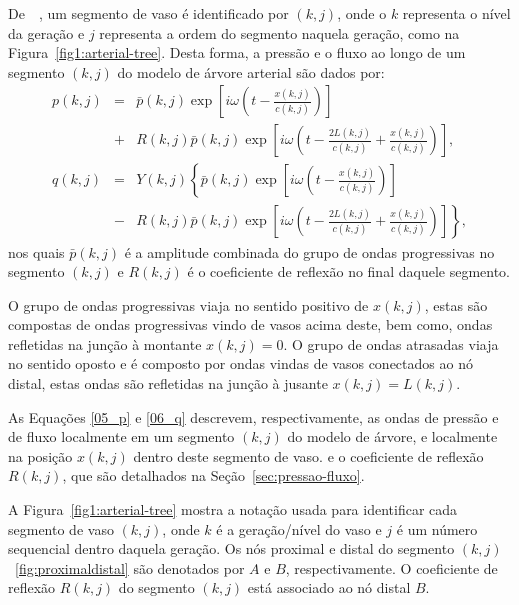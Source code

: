 De~\citeyear{Duan}~, um segmento de vaso é identificado por $(k,j)$, onde o $k$ representa o nível da geração e $j$ representa a ordem do segmento naquela geração, como na Figura~\ref{fig1:arterial-tree}. Desta forma, a pressão e o fluxo ao longo de um segmento  $(k,j)$ do modelo de árvore arterial são dados por:
\begin{eqnarray}
	p(k,j) &=& \bar{p}(k,j) \exp\left[i\omega\left(t - \frac{x(k,j)}{c(k,j)}\right)\right] \nonumber \\
	&+& R(k,j)  \bar{p}(k,j) \exp\left[i\omega\left(t - \frac{2L(k,j)}{c(k,j)} + \frac{x(k,j)}{c(k,j)}\right)\right],
	\label{05_p}\\
	q (k,j) &=& Y(k,j)\left\{\bar{p}(k,j) \exp\left[i\omega\left(t - \frac{x(k,j)}{c(k,j)}\right)\right]\right. \nonumber \\
	&-& \left. R(k,j)  \bar{p}(k,j) \exp\left[i\omega\left(t - \frac{2L(k,j)}{c(k,j)} + \frac{x(k,j)}{c(k,j)}\right)\right]\right\},
	\label{06_q}
\end{eqnarray}
nos quais $\bar{p}(k,j)$ é a amplitude combinada do grupo de ondas progressivas no segmento $(k,j)$ e $R(k,j)$ é o coeficiente de reflexão no final daquele segmento. 

O grupo de ondas progressivas viaja no sentido positivo de $x(k,j)$, estas são compostas de ondas progressivas vindo de vasos acima deste, bem como, ondas refletidas na junção à montante $x(k,j) = 0$. O grupo de ondas atrasadas viaja no sentido oposto e é composto por ondas vindas de vasos conectados ao nó distal, estas ondas são refletidas na junção à jusante $x(k,j) = L(k,j)$. 

As Equações \eqref{05_p} e \eqref{06_q} descrevem, respectivamente, as ondas de pressão e de fluxo localmente em um segmento $(k,j)$ do modelo de árvore, e localmente na posição $x(k,j)$ dentro deste segmento de vaso.  e o coeficiente de reflexão $R (k,j)$, que são detalhados na Seção~\ref{sec:pressao-fluxo}. 

A Figura~\ref{fig1:arterial-tree} mostra a notação usada para identificar cada segmento de vaso $(k,j)$, onde $k$ é a geração/nível do vaso e $j$ é um número sequencial dentro daquela geração. Os nós proximal e distal do segmento $(k,j)$~\ref{fig:proximaldistal} são denotados por $A$ e $B$, respectivamente. O coeficiente de reflexão $R(k,j)$ do segmento $(k,j)$ está associado ao nó distal $B$.

